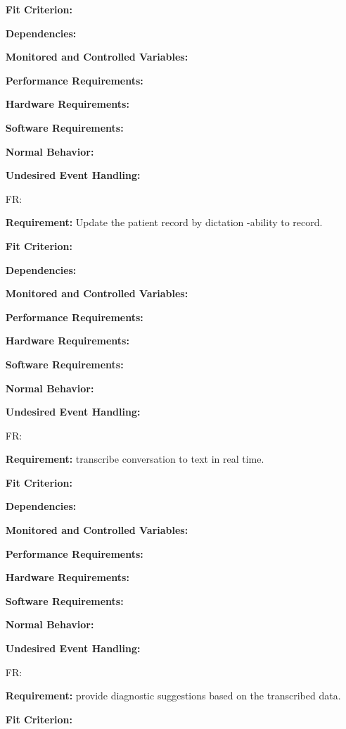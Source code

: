 \documentclass[12pt]{article}
\newcounter{reqnum} %
\begin{document}
\begin{itemize}
\textbf{Fit Criterion:}  

\textbf{Dependencies:}  

\textbf{Monitored and Controlled Variables:} 

\textbf{Performance Requirements:} 

\textbf{Hardware Requirements:} 

\textbf{Software Requirements:} 

\textbf{Normal Behavior:} 

\textbf{Undesired Event Handling:} 

\item[FR\refstepcounter{reqnum}\thereqnum \label{FR_meaningfulLabel}:] 

\textbf{Requirement:} Update the patient record by dictation -ability to record. 

\textbf{Fit Criterion:}  

\textbf{Dependencies:}  

\textbf{Monitored and Controlled Variables:} 

\textbf{Performance Requirements:} 

\textbf{Hardware Requirements:} 

\textbf{Software Requirements:} 

\textbf{Normal Behavior:} 

\textbf{Undesired Event Handling:} 

\item[FR\refstepcounter{reqnum}\thereqnum \label{FR_meaningfulLabel}:] 

\textbf{Requirement:} transcribe conversation to text in real time. 

\textbf{Fit Criterion:}  

\textbf{Dependencies:}  

\textbf{Monitored and Controlled Variables:} 

\textbf{Performance Requirements:} 

\textbf{Hardware Requirements:} 

\textbf{Software Requirements:} 

\textbf{Normal Behavior:} 

\textbf{Undesired Event Handling:} 

\item[FR\refstepcounter{reqnum}\thereqnum \label{FR_meaningfulLabel}:] 

\textbf{Requirement:} provide diagnostic suggestions based on the transcribed data.

\textbf{Fit Criterion:}  


\end{itemize}
\end{document}
